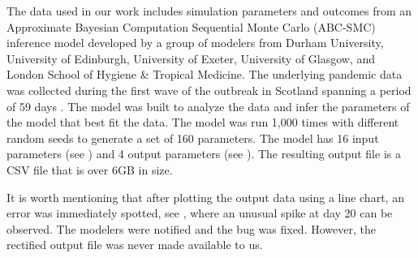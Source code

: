 The data used in our work includes simulation parameters and outcomes from an Approximate Bayesian Computation Sequential Monte Carlo (ABC-SMC) inference model \cite{toni2008Approximate} developed by a group of modelers from Durham University, University of Edinburgh, University of Exeter, University of Glasgow, and London School of Hygiene \& Tropical Medicine. The underlying pandemic data was collected during the first wave of the outbreak in Scotland spanning a period of 59 days \cite{2020Covid19}. The model was built to analyze the data and infer the parameters of the model that best fit the data. The model was run 1,000 times with different random seeds to generate a set of 160 parameters. The model has 16 input parameters (see ) and 4 output parameters (see ). The resulting output file is a CSV file that is over 6GB in size.

It is worth mentioning that after plotting the output data using a line chart, an error was immediately spotted, see , where an unusual spike at day 20 can be observed. The modelers were notified and the bug was fixed. However, the rectified output file was never made available to us.
